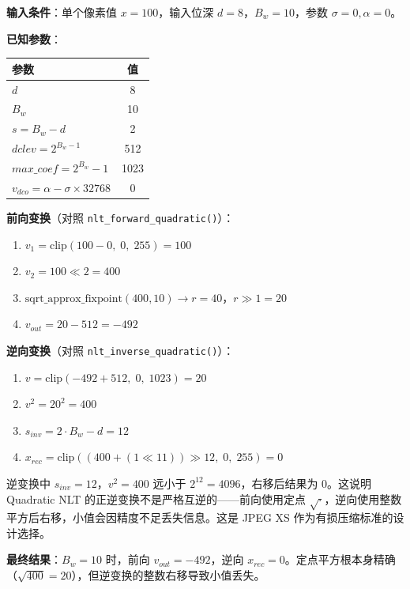 \begin{examplebox}[title={例 2：NLT Quadratic（二次变换）}]

\textbf{输入条件}：单个像素值 $x = 100$，输入位深 $d = 8$，$B_w = 10$，参数 $\sigma = 0, \alpha = 0$。

\medskip
\textbf{已知参数}：

\begin{tabular}{@{}lc@{}}
\toprule
参数 & 值 \\
\midrule
$d$ & 8 \\
$B_w$ & 10 \\
$s = B_w - d$ & 2 \\
$\mathit{dclev} = 2^{B_w-1}$ & 512 \\
$\mathit{max\_coef} = 2^{B_w} - 1$ & 1023 \\
$v_{\mathit{dco}} = \alpha - \sigma \times 32768$ & 0 \\
\bottomrule
\end{tabular}

\medskip
\textbf{前向变换}（对照 \texttt{nlt\_forward\_quadratic()}）：

\begin{enumerate}
  \item $v_1 = \mathrm{clip}(100 - 0,\; 0,\; 255) = 100$
  \item $v_2 = 100 \ll 2 = 400$
  \item $\text{sqrt\_approx\_fixpoint}(400, 10) \to r = 40$，$r \gg 1 = 20$
  \item $v_{\mathit{out}} = 20 - 512 = -492$
\end{enumerate}

\textbf{逆向变换}（对照 \texttt{nlt\_inverse\_quadratic()}）：

\begin{enumerate}
  \item $v = \mathrm{clip}(-492 + 512,\; 0,\; 1023) = 20$
  \item $v^2 = 20^2 = 400$
  \item $s_{\mathit{inv}} = 2 \cdot B_w - d = 12$
  \item $x_{\mathit{rec}} = \mathrm{clip}((400 + (1 \ll 11)) \gg 12,\; 0,\; 255) = 0$
\end{enumerate}

\begin{engineeringnote}
逆变换中 $s_{\mathit{inv}} = 12$，$v^2 = 400$ 远小于 $2^{12} = 4096$，右移后结果为 0。这说明 Quadratic NLT 的正逆变换不是严格互逆的——前向使用定点 $\sqrt{\cdot}$，逆向使用整数平方后右移，小值会因精度不足丢失信息。这是 JPEG XS 作为有损压缩标准的设计选择。
\end{engineeringnote}

\textbf{最终结果}：$B_w = 10$ 时，前向 $v_{\mathit{out}} = -492$，逆向 $x_{\mathit{rec}} = 0$。定点平方根本身精确（$\sqrt{400} = 20$），但逆变换的整数右移导致小值丢失。
\end{examplebox}

